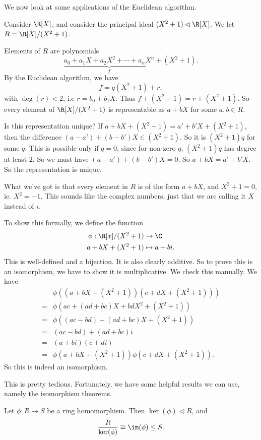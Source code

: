 \documentclass[a4paper]{article}
\begin{document}
We now look at some applications of the Euclidean algorithm.
\begin{eg}
  Consider $\R[X]$, and consider the principal ideal $(X^2 + 1) \lhd \R[X]$. We let $R = \R[X]/(X^2 + 1)$.

  Elements of $R$ are polynomials
  \[
    \underbrace{a_0 + a_1X + a_2 X^2 + \cdots + a_n X^n}_{f} + (X^2 + 1).
  \]
  By the Euclidean algorithm, we have
  \[
    f = q(X^2 + 1) + r,
  \]
  with $\deg(r) < 2$, i.e $r = b_0 + b_1 X$. Thus $f + (X^2 + 1) = r + (X^2 + 1)$. So every element of $\R[X]/(X^2 + 1)$ is representable as $a + bX$ for some $a, b \in R$.

  Is this representation unique? If $a + bX + (X^2 + 1) = a' + b' X + (X^2 + 1)$, then the difference $(a - a') + (b - b')X \in (X^2 + 1)$. So it is $(X^2 + 1)q$ for some $q$. This is possible only if $q = 0$, since for non-zero $q$, $(X^2 + 1)q$ has degree at least $2$. So we must have $(a - a') + (b - b')X = 0$. So $a + bX = a' + b'X$. So the representation is unique.

  What we've got is that every element in $R$ is of the form $a + bX$, and $X^2 + 1 = 0$, ie. $X^2 = -1$. This sounds like the complex numbers, just that we are calling it $X$ instead of $i$.

  To show this formally, we define the function
  \begin{align*}
    \phi: \R[x]/(X^2 + 1) &\to \C\\
    a + bX + (X^2 + 1) & \mapsto a + bi.
  \end{align*}
  This is well-defined and a bijection. It is also clearly additive. So to prove this is an isomorphism, we have to show it is multiplicative. We check this manually. We have
  \begin{align*}
    &\phi((a + bX + (X^2 + 1))(c + dX + (X^2 + 1))) \\
    ={}& \phi(ac + (ad + bc)X + bdX^2 + (X^2 + 1))\\
    ={}& \phi((ac - bd) + (ad + bc)X + (X^2 + 1))\\
    ={}& (ac - bd) + (ad + bc)i\\
    ={}& (a + bi) (c + di)\\
    ={}& \phi(a + bX + (X^2 + 1))\phi(c + dX + (X^2 + 1)).
  \end{align*}
  So this is indeed an isomorphism.
\end{eg}

This is pretty tedious. Fortunately, we have some helpful results we can use, namely the isomorphism theorems.
\begin{thm}
  Let $\phi: R \to S$ be a ring homomorphism. Then $\ker (\phi) \lhd R$, and
  \[
    \frac{R}{\ker (\phi)} \cong \im(\phi) \leq S.
  \]
\end{thm}
\end{document}
